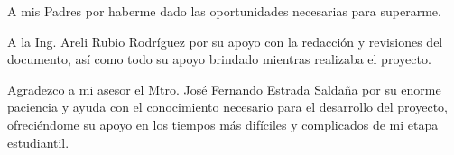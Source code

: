 \begin{thanks}

A mis Padres por haberme dado las oportunidades necesarias para superarme.

A la Ing. Areli Rubio Rodríguez por su apoyo con la redacción y revisiones del documento, así como todo su apoyo brindado mientras realizaba el proyecto.

Agradezco a mi asesor el Mtro. José Fernando Estrada Saldaña por su enorme paciencia y ayuda con el conocimiento necesario para el desarrollo del proyecto, ofreciéndome su apoyo en los tiempos más difíciles y complicados de mi etapa estudiantil.



\end{thanks}

